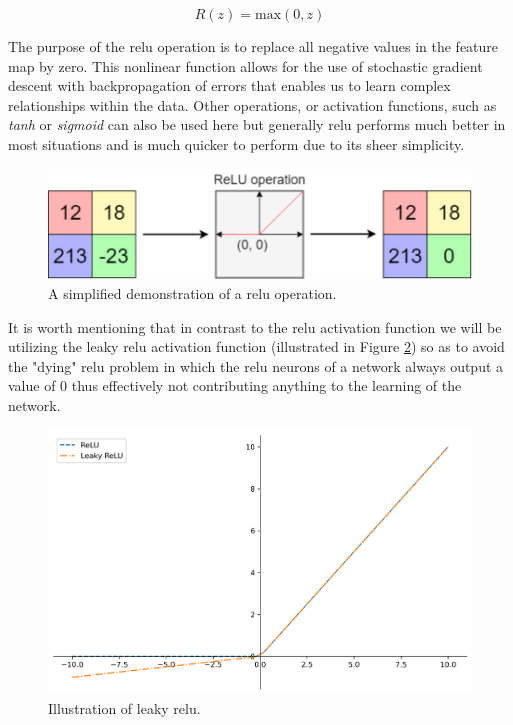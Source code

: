 \begin{equation}
    R(z) = \text{max}(0, z)
\label{eq:ReLU}
\end{equation}

\noindent \newline The purpose of the \gls{relu} operation is to replace all negative values in the feature map by zero. This nonlinear function allows for the use of stochastic gradient descent with backpropagation of errors that enables us to learn complex relationships within the data.  Other operations, or activation functions, such as \textit{tanh} or \textit{sigmoid} can also be used here but generally \gls{relu} performs much better in most situations and is much quicker to perform due to its sheer simplicity.

\begin{figure}[hbt!]
    \centering
    \includegraphics[width=\textwidth]{Images/Chapter 3/CNN/ReLU-Illustration.pdf}
    \caption{A simplified demonstration of a \gls{relu} operation.}
    \label{fig:ReLU-Illustration}
\end{figure}

\noindent \newline It is worth mentioning that in contrast to the \gls{relu} activation function we will be utilizing the leaky \gls{relu} activation function (illustrated in Figure \ref{fig:Leaky-ReLU}) so as to avoid the "dying" \gls{relu} problem in which the \gls{relu} neurons of a network always output a value of 0 thus effectively not contributing anything to the learning of the network.

\begin{figure}[H]
    \centering
    \includegraphics[width=\textwidth]{Images/Chapter 5/Stage 4/Other/Leaky-ReLU.pdf}
    \caption{Illustration of leaky \gls{relu}.}
    \label{fig:Leaky-ReLU}
\end{figure}

